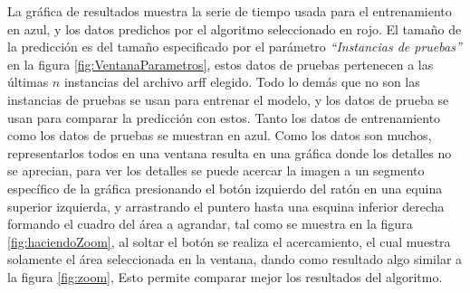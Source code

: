 La gráfica de resultados muestra la serie de tiempo usada para el entrenamiento en azul, y los datos predichos por el algoritmo seleccionado en rojo. El tamaño de la predicción es del tamaño especificado por el parámetro \textit{``Instancias de pruebas''} en la figura \ref{fig:VentanaParametros}, estos datos de pruebas pertenecen a las últimas $n$ instancias del archivo arff elegido. Todo lo demás que no son las instancias de pruebas se usan para entrenar el modelo, y los datos de prueba se usan para comparar la predicción con estos. Tanto los datos de entrenamiento como los datos de pruebas se muestran en azul.
Como los datos son muchos, representarlos todos en una ventana resulta en una gráfica donde los detalles no se aprecian, para ver los detalles se puede acercar la imagen a un segmento específico de la gráfica presionando el botón izquierdo del ratón en una equina superior izquierda, y arrastrando el puntero hasta una esquina inferior derecha formando el cuadro del área a agrandar, tal como se muestra en la figura \ref{fig:haciendoZoom}, al soltar el botón se realiza el acercamiento, el cual muestra solamente el área seleccionada en la ventana, dando como resultado algo similar a la figura \ref{fig:zoom}, Esto permite comparar mejor los resultados del algoritmo.

